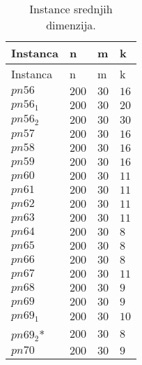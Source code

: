 \documentclass[a4paper]{article}
\begin{document}
\begin{longtabu} to 1\textwidth{|  X[2] | X  X  X  }\caption{Instance srednjih dimenzija.\label{instancetable}}\\ Instanca & n & m &k \\\hline\endfirsthead \endfoot Instanca & n & m &k \\\hline\endhead\hline\endlastfoot $pn56$& $200$ & $30$ & $16$\\ 
$pn56_1$& $200$ & $30$ & $20$\\ 
$pn56_2$& $200$ & $30$ & $30$\\ 
$pn57$& $200$ & $30$ & $16$\\ 
$pn58$& $200$ & $30$ & $16$\\ 
$pn59$& $200$ & $30$ & $16$\\ 
$pn60$& $200$ & $30$ & $11$\\ 
$pn61$& $200$ & $30$ & $11$\\ 
$pn62$& $200$ & $30$ & $11$\\ 
$pn63$& $200$ & $30$ & $11$\\ 
$pn64$& $200$ & $30$ & $8$\\ 
$pn65$& $200$ & $30$ & $8$\\ 
$pn66$& $200$ & $30$ & $8$\\ 
$pn67$& $200$ & $30$ & $11$\\ 
$pn68$& $200$ & $30$ & $9$\\ 
$pn69$& $200$ & $30$ & $9$\\ 
$pn69_1$& $200$ & $30$ & $10$\\ 
$pn69_2$*& $200$ & $30$ & $8$\\ 
$pn70$& $200$ & $30$ & $9$\\ 
\end{longtabu}
\end{document}
